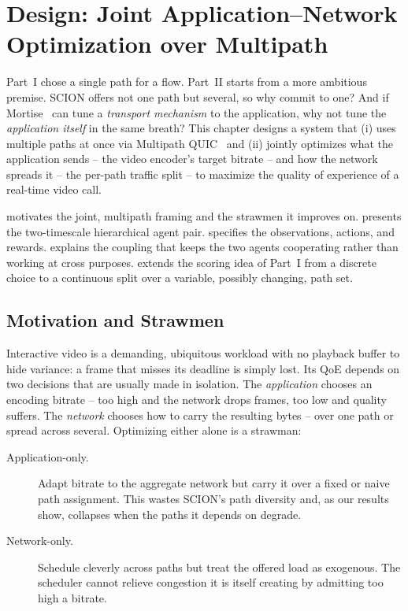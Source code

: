 \chapter{Design: Joint Application--Network Optimization over Multipath}
\label{ch:p2design}

Part~I chose a single path for a flow. Part~II starts from a more ambitious premise. SCION offers not
one path but several, so why commit to one? And if Mortise~\cite{Shen2026} can tune a
\emph{transport mechanism} to the application, why not tune the \emph{application itself} in the same
breath? This chapter designs a system that (i) uses multiple paths at once via Multipath
QUIC~\cite{DeConinck2017} and (ii) jointly optimizes what the application sends -- the video encoder's
target bitrate -- and how the network spreads it -- the per-path traffic split -- to maximize the
quality of experience of a real-time video call.

 motivates the joint, multipath framing and the strawmen it improves on.
 presents the two-timescale hierarchical agent pair.
 specifies the observations, actions, and rewards.
 explains the coupling that keeps the two agents cooperating rather than
working at cross purposes.  extends the scoring idea of Part~I from a discrete
choice to a continuous split over a variable, possibly changing, path set.

\section{Motivation and Strawmen}
\label{sec:p2design:motivation}

Interactive video is a demanding, ubiquitous workload with no playback buffer to hide variance: a frame
that misses its deadline is simply lost. Its QoE depends on two decisions that are usually made in
isolation. The \emph{application} chooses an encoding bitrate -- too high and the network drops frames,
too low and quality suffers. The \emph{network} chooses how to carry the resulting bytes -- over one path
or spread across several. Optimizing either alone is a strawman:

\begin{description}
  \item[Application-only.] Adapt bitrate to the aggregate network but carry it over a fixed or naive
  path assignment. This wastes SCION's path diversity and, as our results show, collapses when the paths
  it depends on degrade.
  \item[Network-only.] Schedule cleverly across paths but treat the offered load as exogenous. The
  scheduler cannot relieve congestion it is itself creating by admitting too high a bitrate.
\end{description}

